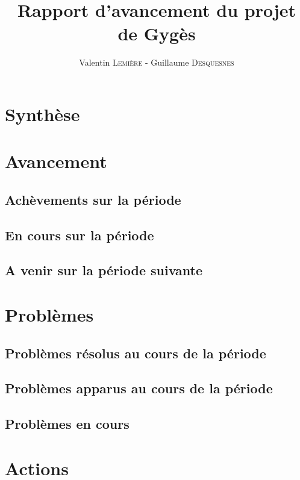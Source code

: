 \documentclass[a4paper]{article}
\title{Rapport d'avancement du projet de Gygès}
\author{Valentin \textsc{Lemière} - Guillaume \textsc{Desquesnes}}
\date{}
\begin{document}
\maketitle

\section*{Synthèse}


\section*{Avancement}
	\subsection*{Achèvements sur la période}
	\subsection*{En cours sur la période}
	\subsection*{A venir sur la période suivante}
	
	
\section*{Problèmes}
	\subsection*{Problèmes résolus au cours de la période}
	\subsection*{Problèmes apparus au cours de la période}
	\subsection*{Problèmes en cours}


\section*{Actions}
\end{document}
